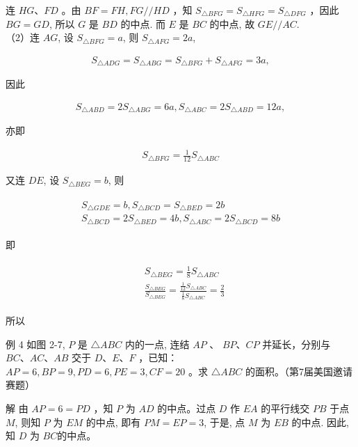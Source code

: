 \documentclass[10pt]{article}
\begin{document}
连 $H G 、 F D$ 。由 $B F=F H, F G / / H D$ ，知 $S_{\triangle B F G}=S_{\triangle H F G}=S_{\triangle D F G}$ ，因此 $B G=G D$, 所以 $G$ 是 $B D$ 的中点. 而 $E$ 是 $B C$ 的中点, 故 $G E / / A C$.\\
（2）连 $A G$, 设 $S_{\triangle B F G}=a$, 则 $S_{\triangle A F G}=2 a$,

\begin{align*}
S_{\triangle A D G}=S_{\triangle A B G}=S_{\triangle B F G}+S_{\triangle A F G}=3 a,
\end{align*}

因此

\begin{align*}
S_{\triangle A B D}=2 S_{\triangle A B G}=6 a, S_{\triangle A B C}=2 S_{\triangle A B D}=12 a,
\end{align*}

亦即

\begin{align*}
S_{\triangle B F G}=\frac{1}{12} S_{\triangle A B C}
\end{align*}

又连 $D E$, 设 $S_{\triangle B E G}=b$, 则

\begin{align*}
\begin{gathered}
S_{\triangle G D E}=b, S_{\triangle B C D}=S_{\triangle B E D}=2 b \\
S_{\triangle B C D}=2 S_{\triangle B E D}=4 b, S_{\triangle A B C}=2 S_{\triangle B C D}=8 b
\end{gathered}
\end{align*}

即

\begin{align*}
\begin{aligned}
& S_{\triangle B E G}=\frac{1}{8} S_{\triangle A B C} \\
& \frac{S_{\triangle B E G}}{S_{\triangle B E G}}=\frac{\frac{1}{12} S_{\triangle A B C}}{\frac{1}{8} S_{\triangle A B C}}=\frac{2}{3}
\end{aligned}
\end{align*}

所以

例 4 如图 2-7, $P$ 是 $\triangle A B C$ 内的一点, 连结 $A P$ 、 $B P 、 C P$ 并延长，分别与 $B C 、 A C 、 A B$ 交于 $D 、 E 、 F$ ，已知： $A P=6, B P=9, P D=6, P E=3, C F=20$ 。求 $\triangle A B C$ 的面积。（第7届美国邀请赛题）

解 由 $A P=6=P D$ ，知 $P$ 为 $A D$ 的中点。过点 $D$ 作 $E A$ 的平行线交 $P B$ 于点 $M$, 则知 $P$ 为 $E M$ 的中点, 即有 $P M=E P=3$, 于是, 点 $M$ 为 $E B$ 的中点. 因此, 知 $D$ 为 $B C$的中点。
\end{document}

